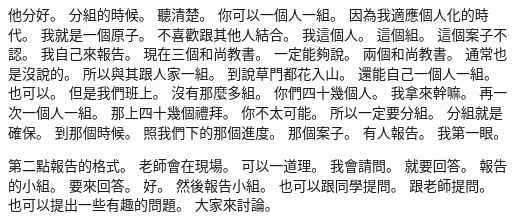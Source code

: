 \hypertarget{c01:cue:925}{}他分好。
\hypertarget{c01:cue:926}{}分組的時候。
\hypertarget{c01:cue:927}{}聽清楚。
\hypertarget{c01:cue:928}{}你可以一個人一組。
\hypertarget{c01:cue:929}{}因為我適應個人化的時代。
\hypertarget{c01:cue:930}{}我就是一個原子。
\hypertarget{c01:cue:931}{}不喜歡跟其他人結合。
\hypertarget{c01:cue:932}{}我這個人。
\hypertarget{c01:cue:933}{}這個組。
\hypertarget{c01:cue:934}{}這個案子不認。
\hypertarget{c01:cue:935}{}我自己來報告。
\hypertarget{c01:cue:936}{}現在三個和尚教書。
\hypertarget{c01:cue:937}{}一定能夠說。
\hypertarget{c01:cue:938}{}兩個和尚教書。
\hypertarget{c01:cue:939}{}通常也是沒說的。
\hypertarget{c01:cue:940}{}所以與其跟人家一組。
\hypertarget{c01:cue:941}{}到說草門都花入山。
\hypertarget{c01:cue:942}{}還能自己一個人一組。
\hypertarget{c01:cue:943}{}也可以。
\hypertarget{c01:cue:944}{}但是我們班上。
\hypertarget{c01:cue:945}{}沒有那麼多組。
\hypertarget{c01:cue:946}{}你們四十幾個人。
\hypertarget{c01:cue:947}{}我拿來幹嘛。
\hypertarget{c01:cue:948}{}再一次一個人一組。
\hypertarget{c01:cue:949}{}那上四十幾個禮拜。
\hypertarget{c01:cue:950}{}你不太可能。
\hypertarget{c01:cue:951}{}所以一定要分組。
\hypertarget{c01:cue:952}{}分組就是確保。
\hypertarget{c01:cue:953}{}到那個時候。
\hypertarget{c01:cue:954}{}照我們下的那個進度。
\hypertarget{c01:cue:955}{}那個案子。
\hypertarget{c01:cue:956}{}有人報告。
\hypertarget{c01:cue:957}{}我第一眼。

\hypertarget{c01:cue:958}{}第二點報告的格式。
\hypertarget{c01:cue:959}{}老師會在現場。
\hypertarget{c01:cue:960}{}可以一道理。
\hypertarget{c01:cue:961}{}我會請問。
\hypertarget{c01:cue:962}{}就要回答。
\hypertarget{c01:cue:963}{}報告的小組。
\hypertarget{c01:cue:964}{}要來回答。
\hypertarget{c01:cue:965}{}好。
\hypertarget{c01:cue:966}{}然後報告小組。
\hypertarget{c01:cue:967}{}也可以跟同學提問。
\hypertarget{c01:cue:968}{}跟老師提問。
\hypertarget{c01:cue:969}{}也可以提出一些有趣的問題。
\hypertarget{c01:cue:970}{}大家來討論。

